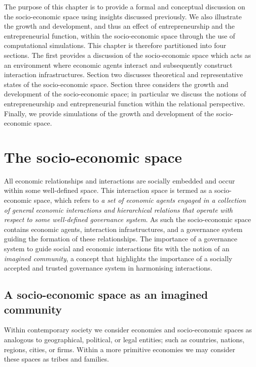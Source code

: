 The purpose of this chapter is to provide a formal and conceptual discussion on the socio-economic space using insights discussed previously. We also illustrate the growth and development, and thus an effect of entrepreneurship and the entrepreneurial function, within the socio-economic space through the use of computational simulations. This chapter is therefore partitioned into four sections. The first provides a discussion of the socio-economic space which acts as an environment where economic agents interact and subsequently construct interaction infrastructures. Section two discusses theoretical and representative states of the socio-economic space. Section three considers the growth and development of the socio-economic space; in particular we discuss the notions of entrepreneurship and entrepreneurial function within the relational perspective. Finally, we provide simulations of the growth and development of the socio-economic space.

\section{The socio-economic space} \label{sec:socio-economicspace}

All economic relationships and interactions are socially embedded and occur within some well-defined space. This interaction space is termed as a socio-economic space, which refers to \emph{a set of economic agents engaged in a collection of general economic interactions and hierarchical relations that operate with respect to some well-defined governance system}. As such the socio-economic space contains economic agents, interaction infrastructures, and a governance system guiding the formation of these relationships. The importance of a governance system to guide social and economic interactions fits with the notion of an \emph{imagined community}, a concept that highlights the importance of a socially accepted and trusted governance system in harmonising interactions.

\subsection{A socio-economic space as an imagined community}

Within contemporary society we consider economies and socio-economic spaces as analogous to geographical, political, or legal entities; such as countries, nations, regions, cities, or firms. Within a more primitive economies we may consider these spaces as tribes and families.

